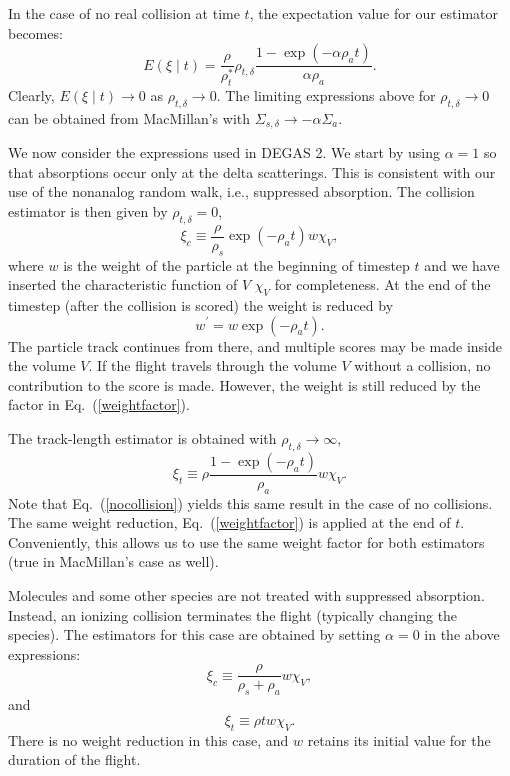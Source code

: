 \documentclass[12pt]{report}
\begin{document}
In the case of no real collision at time $t$, the expectation value
for our estimator becomes:
\begin{equation}
E(\xi \mid t) = \frac{\rho}{\rho_{t}^{\ast}} \rho_{t,\delta}
\frac{1 - \exp(- \alpha \rho_{a} t)}{\alpha \rho_{a}}.
\label{nocollision}
\end{equation}
Clearly, $E(\xi \mid t) \rightarrow 0$ as $\rho_{t,\delta} \rightarrow 0$.
The limiting expressions above for $\rho_{t,\delta} \rightarrow 0$
can be obtained from MacMillan's with $\Sigma_{s,\delta} \rightarrow
- \alpha \Sigma_{a}$.

We now consider the expressions used in DEGAS 2. We start by using
$\alpha = 1$ so that absorptions occur only at the delta scatterings.
This is consistent with our use of the nonanalog random walk, i.e.,
suppressed absorption. The collision estimator is then given by
$\rho_{t,\delta} = 0$,
\begin{equation}
\xi_{c} \equiv \frac{\rho}{\rho_{s}} \exp(- \rho_{a} t) w \chi_{V},
\label{ce}
\end{equation}
where $w$ is the weight of the particle at the beginning of timestep
$t$ and we have inserted the characteristic function of $V$ $\chi_{V}$ 
for completeness.
At the end of the timestep (after the collision is scored) the weight
is reduced by
\begin{equation}
w^{\prime} = w \exp( - \rho_{a} t).
\label{weightfactor}
\end{equation}
The particle track continues from there, and multiple scores may be made
inside the volume $V$. If the flight travels through the volume $V$ without
a collision, no contribution to the score is made. However, the
weight is still reduced by the factor in Eq.~(\ref{weightfactor}).

The track-length estimator is obtained with $\rho_{t,\delta} \rightarrow
\infty$,
\begin{equation}
\xi_{t} \equiv \rho \frac{1 - \exp(- \rho_{a} t)}{\rho_{a}} w \chi_{V}.
\label{tle}
\end{equation}
Note that Eq.~(\ref{nocollision}) yields this same result in the case
of no collisions. The same weight reduction, Eq.~(\ref{weightfactor})
is applied at the end of $t$. Conveniently, this allows us to use the
same weight factor for both estimators (true in MacMillan's case as well).

Molecules and some other species are not treated with suppressed absorption.
Instead, an ionizing collision terminates the flight (typically changing
the species). The estimators for this case are obtained by setting
$\alpha = 0$ in the above expressions:
\begin{equation}
\xi_{c} \equiv \frac{\rho}{\rho_{s} + \rho_{a}} w \chi_{V},
\end{equation}
and
\begin{equation}
\xi_{t} \equiv \rho t w \chi_{V}.
\end{equation}
There is no weight reduction in this case, and $w$ retains its initial
value for the duration of the flight.
\end{document}
